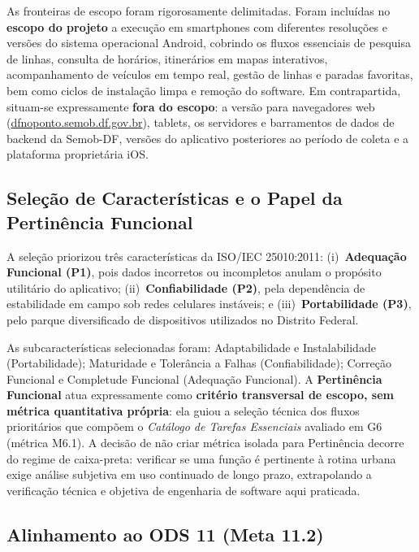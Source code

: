 \documentclass[11pt,a4paper]{article}
\begin{document}
As fronteiras de escopo foram rigorosamente delimitadas. Foram incluídas no \textbf{escopo do projeto} a execução em smartphones com diferentes resoluções e versões do sistema operacional Android, cobrindo os fluxos essenciais de pesquisa de linhas, consulta de horários, itinerários em mapas interativos, acompanhamento de veículos em tempo real, gestão de linhas e paradas favoritas, bem como ciclos de instalação limpa e remoção do software. Em contrapartida, situam-se expressamente \textbf{fora do escopo}: a versão para navegadores web (\url{dfnoponto.semob.df.gov.br}), tablets, os servidores e barramentos de dados de backend da Semob-DF, versões do aplicativo posteriores ao período de coleta e a plataforma proprietária iOS.

\subsection{Seleção de Características e o Papel da Pertinência Funcional}
\label{sec:selecao_caracteristicas}

A seleção priorizou três características da ISO/IEC 25010:2011: (i)~\textbf{Adequação Funcional (P1)}, pois dados incorretos ou incompletos anulam o propósito utilitário do aplicativo; (ii)~\textbf{Confiabilidade (P2)}, pela dependência de estabilidade em campo sob redes celulares instáveis; e (iii)~\textbf{Portabilidade (P3)}, pelo parque diversificado de dispositivos utilizados no Distrito Federal.

As subcaracterísticas selecionadas foram: Adaptabilidade e Instalabilidade (Portabilidade); Maturidade e Tolerância a Falhas (Confiabilidade); Correção Funcional e Completude Funcional (Adequação Funcional). A \textbf{Pertinência Funcional} atua expressamente como \textbf{critério transversal de escopo, sem métrica quantitativa própria}: ela guiou a seleção técnica dos fluxos prioritários que compõem o \textit{Catálogo de Tarefas Essenciais} avaliado em G6 (métrica M6.1). A decisão de não criar métrica isolada para Pertinência decorre do regime de caixa-preta: verificar se uma função é pertinente à rotina urbana exige análise subjetiva em uso continuado de longo prazo, extrapolando a verificação técnica e objetiva de engenharia de software aqui praticada.

\subsection{Alinhamento ao ODS 11 (Meta 11.2)}
\label{sec:ods11}
\end{document}
